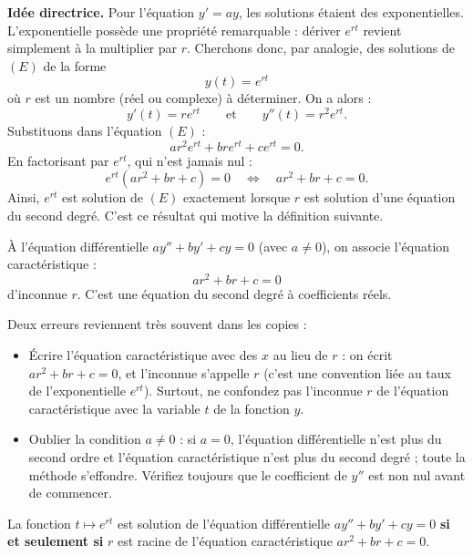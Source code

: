 \documentclass[11pt]{article}
\newcommand{\cle}[1]{{\popxbold\color{popdark}#1}}
\newcounter{popsec}
\newcounter{popsub}
\newcommand{\courssub}[1]{%
  \stepcounter{popsub}%
  \par\vspace{9pt}\noindent{\popxbold\fontsize{11.5}{13}\selectfont\color{popink}{\color{poporange}\thepopsec.\thepopsub}\hspace{6pt}#1}\par\nopagebreak\vspace{4pt}
}
\begin{document}
\textbf{Idée directrice.} Pour l'équation $y' = ay$, les solutions étaient des exponentielles. L'exponentielle possède une propriété remarquable : dériver $e^{rt}$ revient simplement à la multiplier par $r$. Cherchons donc, par analogie, des solutions de $(E)$ de la forme
\[ y(t) = e^{rt} \]
où $r$ est un nombre (réel ou complexe) à déterminer. On a alors :
\[ y'(t) = re^{rt} \qquad \text{et} \qquad y''(t) = r^2 e^{rt}. \]
Substituons dans l'équation $(E)$ :
\[ a r^2 e^{rt} + b r e^{rt} + c e^{rt} = 0. \]
En factorisant par $e^{rt}$, qui n'est jamais nul :
\[ e^{rt}\left(ar^2 + br + c\right) = 0 \quad \Longleftrightarrow \quad ar^2 + br + c = 0. \]
Ainsi, $e^{rt}$ est solution de $(E)$ exactement lorsque $r$ est solution d'une équation du second degré. C'est ce résultat qui motive la définition suivante.

\courssub{L'équation caractéristique}

\begin{definition}
À l'équation différentielle $ay'' + by' + cy = 0$ (avec $a \neq 0$), on associe l'\cle{équation caractéristique} :
\[ ar^2 + br + c = 0 \]
d'inconnue $r$. C'est une équation du second degré à coefficients réels.
\end{definition}

\begin{attention}
Deux erreurs reviennent très souvent dans les copies :
\begin{itemize}
\item Écrire l'équation caractéristique avec des $x$ au lieu de $r$ : on écrit $ar^2 + br + c = 0$, et l'inconnue s'appelle $r$ (c'est une convention liée au taux de l'exponentielle $e^{rt}$). Surtout, ne confondez pas l'inconnue $r$ de l'équation caractéristique avec la variable $t$ de la fonction $y$.
\item Oublier la condition $a \neq 0$ : si $a = 0$, l'équation différentielle n'est plus du second ordre et l'équation caractéristique n'est plus du second degré ; toute la méthode s'effondre. Vérifiez toujours que le coefficient de $y''$ est non nul avant de commencer.
\end{itemize}
\end{attention}

\begin{propriete}
La fonction $t \mapsto e^{rt}$ est solution de l'équation différentielle $ay'' + by' + cy = 0$ \textbf{si et seulement si} $r$ est racine de l'équation caractéristique $ar^2 + br + c = 0$.
\end{propriete}
\end{document}
